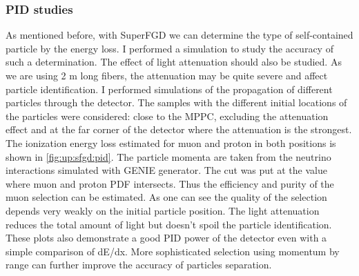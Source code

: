 \documentclass[main.tex]{subfiles}
\begin{document}
\subsubsection{PID studies}
As mentioned before, with SuperFGD we can determine the type of self-contained particle by the energy loss. I performed a simulation to study the accuracy of such a determination. The effect of light attenuation should also be studied. As we are using 2 m long fibers, the attenuation may be quite severe and affect particle identification. I performed simulations of the propagation of different particles through the detector. The samples with the different initial locations of the particles were considered: close to the MPPC, excluding the attenuation effect and at the far corner of the detector where the attenuation is the strongest. The ionization energy loss estimated for muon and proton in both positions is shown in \autoref{fig:up:sfgd:pid}. The particle momenta are taken from the neutrino interactions simulated with GENIE generator. The cut was put at the value where muon and proton PDF intersects. Thus the efficiency and purity of the muon selection can be estimated. As one can see the quality of the selection depends very weakly on the initial particle position. The light attenuation reduces the total amount of light but doesn't spoil the particle identification. These plots also demonstrate a good PID power of the detector even with a simple comparison of dE/dx. More sophisticated selection using momentum by range can further improve the accuracy of particles separation.
\end{document}
